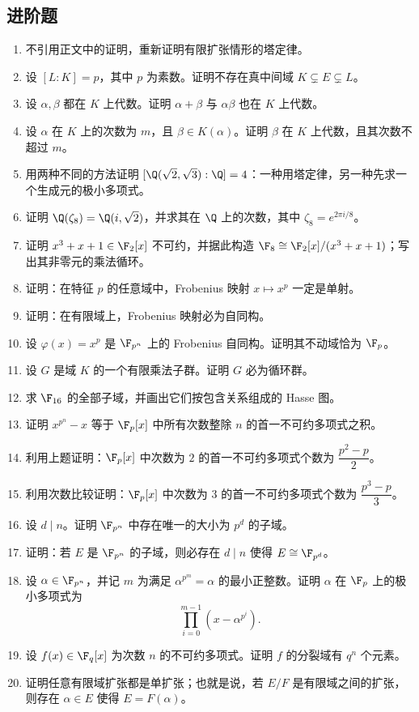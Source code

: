 \subsection*{进阶题}

\begin{enumerate}[label=\arabic*., leftmargin=2.5em, resume]
\item \textbf{\medium} 不引用正文中的证明，重新证明有限扩张情形的塔定律。
\item \textbf{\medium} 设 $[L:K]=p$，其中 $p$ 为素数。证明不存在真中间域 $K\subsetneq E\subsetneq L$。
\item \textbf{\medium} 设 $\alpha,\beta$ 都在 $K$ 上代数。证明 $\alpha+\beta$ 与 $\alpha\beta$ 也在 $K$ 上代数。
\item \textbf{\medium} 设 $\alpha$ 在 $K$ 上的次数为 $m$，且 $\beta\in K(\alpha)$。证明 $\beta$ 在 $K$ 上代数，且其次数不超过 $m$。
\item \textbf{\medium} 用两种不同的方法证明 $[\Q(\sqrt2,\sqrt3):\Q]=4$：一种用塔定律，另一种先求一个生成元的极小多项式。
\item \textbf{\medium} 证明 $\Q(\zeta_8)=\Q(i,\sqrt2)$，并求其在 $\Q$ 上的次数，其中 $\zeta_8=e^{2\pi i/8}$。
\item \textbf{\medium} 证明 $x^3+x+1\in\F_2[x]$ 不可约，并据此构造 $\F_8\cong \F_2[x]/(x^3+x+1)$；写出其非零元的乘法循环。
\item \textbf{\medium} 证明：在特征 $p$ 的任意域中，Frobenius 映射 $x\mapsto x^p$ 一定是单射。
\item \textbf{\medium} 证明：在有限域上，Frobenius 映射必为自同构。
\item \textbf{\medium} 设 $\varphi(x)=x^p$ 是 $\F_{p^n}$ 上的 Frobenius 自同构。证明其不动域恰为 $\F_p$。
\item \textbf{\medium} 设 $G$ 是域 $K$ 的一个有限乘法子群。证明 $G$ 必为循环群。
\item \textbf{\medium} 求 $\F_{16}$ 的全部子域，并画出它们按包含关系组成的 Hasse 图。
\item \textbf{\medium} 证明 $x^{p^n}-x$ 等于 $\F_p[x]$ 中所有次数整除 $n$ 的首一不可约多项式之积。
\item \textbf{\medium} 利用上题证明：$\F_p[x]$ 中次数为 $2$ 的首一不可约多项式个数为 $\dfrac{p^2-p}{2}$。
\item \textbf{\medium} 利用次数比较证明：$\F_p[x]$ 中次数为 $3$ 的首一不可约多项式个数为 $\dfrac{p^3-p}{3}$。
\item \textbf{\medium} 设 $d\mid n$。证明 $\F_{p^n}$ 中存在唯一的大小为 $p^d$ 的子域。
\item \textbf{\medium} 证明：若 $E$ 是 $\F_{p^n}$ 的子域，则必存在 $d\mid n$ 使得 $E\cong \F_{p^d}$。
\item \textbf{\medium} 设 $\alpha\in\F_{p^n}$，并记 $m$ 为满足 $\alpha^{p^m}=\alpha$ 的最小正整数。证明 $\alpha$ 在 $\F_p$ 上的极小多项式为
\[
\prod_{i=0}^{m-1}(x-\alpha^{p^i}).
\]
\item \textbf{\medium} 设 $f(x)\in\F_q[x]$ 为次数 $n$ 的不可约多项式。证明 $f$ 的分裂域有 $q^n$ 个元素。
\item \textbf{\medium} 证明任意有限域扩张都是单扩张；也就是说，若 $E/F$ 是有限域之间的扩张，则存在 $\alpha\in E$ 使得 $E=F(\alpha)$。
\end{enumerate}

